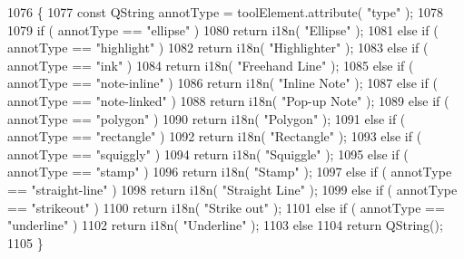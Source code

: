 \begin{DoxyCode}
1076 \{
1077     \textcolor{keyword}{const} QString annotType = toolElement.attribute( \textcolor{stringliteral}{"type"} );
1078 
1079     \textcolor{keywordflow}{if} ( annotType == \textcolor{stringliteral}{"ellipse"} )
1080         \textcolor{keywordflow}{return} i18n( \textcolor{stringliteral}{"Ellipse"} );
1081     \textcolor{keywordflow}{else} \textcolor{keywordflow}{if} ( annotType == \textcolor{stringliteral}{"highlight"} )
1082         \textcolor{keywordflow}{return} i18n( \textcolor{stringliteral}{"Highlighter"} );
1083     \textcolor{keywordflow}{else} \textcolor{keywordflow}{if} ( annotType == \textcolor{stringliteral}{"ink"} )
1084         \textcolor{keywordflow}{return} i18n( \textcolor{stringliteral}{"Freehand Line"} );
1085     \textcolor{keywordflow}{else} \textcolor{keywordflow}{if} ( annotType == \textcolor{stringliteral}{"note-inline"} )
1086         \textcolor{keywordflow}{return} i18n( \textcolor{stringliteral}{"Inline Note"} );
1087     \textcolor{keywordflow}{else} \textcolor{keywordflow}{if} ( annotType == \textcolor{stringliteral}{"note-linked"} )
1088         \textcolor{keywordflow}{return} i18n( \textcolor{stringliteral}{"Pop-up Note"} );
1089     \textcolor{keywordflow}{else} \textcolor{keywordflow}{if} ( annotType == \textcolor{stringliteral}{"polygon"} )
1090         \textcolor{keywordflow}{return} i18n( \textcolor{stringliteral}{"Polygon"} );
1091     \textcolor{keywordflow}{else} \textcolor{keywordflow}{if} ( annotType == \textcolor{stringliteral}{"rectangle"} )
1092         \textcolor{keywordflow}{return} i18n( \textcolor{stringliteral}{"Rectangle"} );
1093     \textcolor{keywordflow}{else} \textcolor{keywordflow}{if} ( annotType == \textcolor{stringliteral}{"squiggly"} )
1094         \textcolor{keywordflow}{return} i18n( \textcolor{stringliteral}{"Squiggle"} );
1095     \textcolor{keywordflow}{else} \textcolor{keywordflow}{if} ( annotType == \textcolor{stringliteral}{"stamp"} )
1096         \textcolor{keywordflow}{return} i18n( \textcolor{stringliteral}{"Stamp"} );
1097     \textcolor{keywordflow}{else} \textcolor{keywordflow}{if} ( annotType == \textcolor{stringliteral}{"straight-line"} )
1098         \textcolor{keywordflow}{return} i18n( \textcolor{stringliteral}{"Straight Line"} );
1099     \textcolor{keywordflow}{else} \textcolor{keywordflow}{if} ( annotType == \textcolor{stringliteral}{"strikeout"} )
1100         \textcolor{keywordflow}{return} i18n( \textcolor{stringliteral}{"Strike out"} );
1101     \textcolor{keywordflow}{else} \textcolor{keywordflow}{if} ( annotType == \textcolor{stringliteral}{"underline"} )
1102         \textcolor{keywordflow}{return} i18n( \textcolor{stringliteral}{"Underline"} );
1103     \textcolor{keywordflow}{else}
1104         \textcolor{keywordflow}{return} QString();
1105 \}
\end{DoxyCode}
